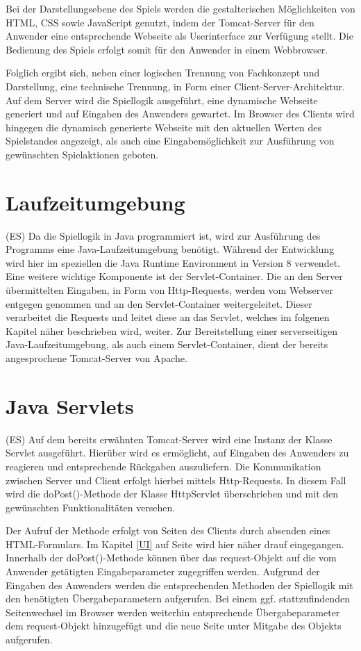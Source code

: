 Bei der Darstellungsebene des Spiels werden die gestalterischen Möglichkeiten von HTML, CSS sowie JavaScript genutzt, indem der Tomcat-Server für den Anwender eine entsprechende Webseite als Userinterface zur Verfügung stellt. Die Bedienung des Spiels erfolgt somit für den Anwender in einem Webbrowser.

Folglich ergibt sich, neben einer logischen Trennung von Fachkonzept und Darstellung, eine technische Trennung, in Form einer Client-Server-Architektur. Auf dem Server wird die Spiellogik ausgeführt, eine dynamische Webseite generiert und auf Eingaben des Anwenders gewartet. Im Browser des Clients wird hingegen die dynamisch generierte Webseite mit den aktuellen Werten des Spielstandes angezeigt, als auch eine Eingabemöglichkeit zur Ausführung von gewünschten Spielaktionen geboten.

\section{Laufzeitumgebung}
(ES) Da die Spiellogik in Java programmiert ist, wird zur Ausführung des Programms eine Java-Laufzeitumgebung benötigt. Während der Entwicklung wird hier im speziellen die Java Runtime Environment in Version 8 verwendet. Eine weitere wichtige Komponente ist der Servlet-Container. Die an den Server übermittelten Eingaben, in Form von Http-Requests, werden vom Webserver entgegen genommen und an den Servlet-Container weitergeleitet. Dieser verarbeitet die Requests und leitet diese an das Servlet, welches im folgenen Kapitel näher beschrieben wird, weiter. Zur Bereitstellung einer serverseitigen Java-Laufzeitumgebung, als auch einem Servlet-Container, dient der bereits angesprochene Tomcat-Server von Apache.

\section{Java Servlets}\label{sec:Servlets}
(ES) Auf dem bereits erwähnten Tomcat-Server wird eine Instanz der Klasse Servlet ausgeführt. Hierüber wird es ermöglicht, auf Eingaben des Anwenders zu reagieren und entsprechende Rückgaben auszuliefern. Die Kommunikation zwischen Server und Client erfolgt hierbei mittels Http-Requests. In diesem Fall wird die doPost()-Methode der Klasse HttpServlet überschrieben und mit den gewünschten Funktionalitäten versehen.

Der Aufruf der Methode erfolgt von Seiten des Clients durch absenden eines HTML-Formulars. Im Kapitel \ref{UI} auf Seite \pageref{UI} wird hier näher drauf eingegangen. Innerhalb der doPost()-Methode können über das request-Objekt auf die vom Anwender getätigten Eingabeparameter zugegriffen werden. Aufgrund der Eingaben des Anwenders werden die entsprechenden Methoden der Spiellogik mit den benötigten Übergabeparametern aufgerufen. Bei einem ggf. stattzufindenden Seitenwechsel im Browser werden weiterhin entsprechende Übergabeparameter dem request-Objekt hinzugefügt und die neue Seite unter Mitgabe des Objekts aufgerufen.

